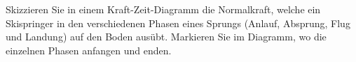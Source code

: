 Skizzieren Sie in einem Kraft-Zeit-Diagramm die Normalkraft, welche ein Skispringer in den verschiedenen Phasen eines Sprungs (Anlauf, Absprung, Flug und Landung) auf den Boden ausübt. Markieren Sie im Diagramm, wo die einzelnen Phasen anfangen und enden.
